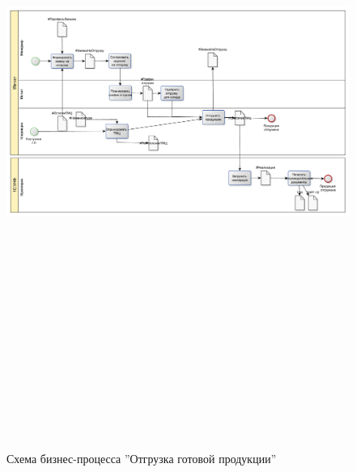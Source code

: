 \begin{figure}[!htb]
\centering
  \includegraphics[width=200mm, height=220mm, angle=90, keepaspectratio]{50_Pics/5 Shipment.pdf}
\caption{Схема бизнес-процесса ''Отгрузка готовой продукции''}
\label{pic:4_Shipment}
\end{figure} 

